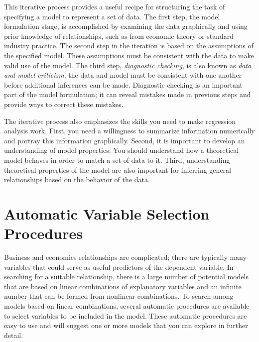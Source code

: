\newpage



This iterative process provides a useful recipe for structuring the
task of specifying a model to represent a set of data. The first
step, the model formulation stage, is accomplished by examining the
data graphically and using prior knowledge of relationships, such as
from economic theory or standard industry practice. The second step
in the iteration is based on the assumptions of the specified model.
These assumptions must be consistent with the data to make valid use
of the model. The third step, \emph{diagnostic checking}, is also
known as \emph{data and model criticism}; the data and model must be
consistent with one another before additional inferences can be
made. Diagnostic checking is an important part of the model
formulation; it can reveal mistakes made in previous steps and
provide ways to correct these mistakes.

The iterative process also emphasizes the skills you need to make
regression analysis work. First, you need a willingness to summarize
information numerically and portray this information graphically.
Second, it is important to develop an understanding of model
properties. You should understand how a theoretical model behaves in
order to match a set of data to it. Third, understanding theoretical
properties of the model are also important for inferring general
relationships based on the behavior of the data.


\section{Automatic Variable Selection
Procedures}\label{S5:Automatic}

Business and economics relationships are complicated; there are
typically many variables that could serve as useful predictors of
the dependent variable. In searching for a suitable relationship,
there is a large number of potential models that are based on linear
combinations of explanatory variables and an infinite number that
can be formed from nonlinear combinations. To search among models
based on linear combinations, several automatic procedures are
available to select variables to be included in the model. These
automatic procedures are easy to use and will suggest one or more
models that you can explore in further detail.

